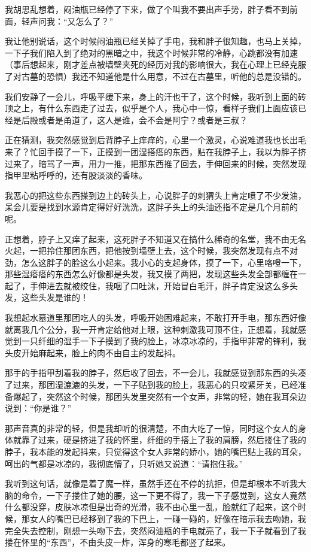 我胡思乱想着，闷油瓶已经停了下来，做了个叫我不要出声手势，胖子看不到前面，轻声问我：“又怎么了？”

我让他别说话，这个时候闷油瓶已经关掉了手电，我和胖子很知趣，也马上关掉，一下子我们陷入到了绝对的黑暗之中，我这个时候非常的冷静，心跳都没有加速（事后想起来，刚才差点被墙壁夹死的经历对我的影响很大，我在心理上已经克服了对古墓的恐惧）我还不知道他是什么用意，不过在古墓里，听他的总是没错的。

我们安静了一会儿，呼吸平缓下来，身上的汗也干了，这个时候，我听到上面的砖顶之上，有什么东西走了过去，似乎是个人，我心中一惊，看样子我们上面应该已经是后殿或者是甬道了，这人是谁，会不会是阿宁？或者是三叔？

正在猜测，我突然感觉到后背脖子上痒痒的，心里一个激灵，心说难道我也长出毛来了？忙回手摸了一下，正摸到一团湿搭瘩的东西，贴在我脖子上，我以为胖子挤过来了，暗骂了一声，用力一推，把那东西推了回去，手伸回来的时候，突然发现指甲里粘呼呼的，还有股淡淡的香味。

我恶心的把这些东西搽到边上的砖头上，心说胖子的刺猬头上肯定喷了不少发油，呆会儿要是找到水源肯定得好好洗洗，这胖子头上的头油还指不定是几个月前的呢。

正想着，脖子上又痒了起来，这死胖子不知道又在搞什么稀奇的名堂，我不由无名火起，一把拎住那团东西，把他按到墙壁上去，这个时候，我突然发现有点不对劲，怎么这胖子的脸这么小起来。我小心的支起身体，摸了一下，心里咯噔一下，那些湿瘩瘩的东西怎么好像都是头发，我又摸了两把，发现这些头发全部都缠在一起了，手伸进去就被绞住，我咽了口吐沫，开始冒白毛汗，胖子肯定没这么多头发，这些头发是谁的！

我想起水墓道里那团吃人的头发，呼吸开始困难起来，不敢打开手电，那东西好像就离我几个公分，我一开肯定给他对上眼，这种刺激我可顶不住，正想着，我就感觉到一只纤细的湿手一下子摸到了我的脸上，冰凉冰凉的，手指甲非常的锋利，我头皮开始麻起来，脸上的肉不由自主的发起抖。

那手的手指甲刮着我的脖子，然后收了回去，不一会儿，我就感觉到那东西的头凑了过来，那团湿漉漉的头发，一下子贴到我的脸上，我恶心的只咬紧牙关，已经准备爆起了，突然这个时候，那团头发里突然有一个女声，非常的轻，她在我耳朵边说到：“你是谁？”

那声音真的非常的轻，但是我却听的很清楚，不由大吃了一惊，同时这个女人的身体就靠了过来，硬是挤进了我的怀里，纤细的手搭上了我的肩膀，然后搂住了我的脖子，我本能的发起抖来，只觉得这个女人非常的娇小，她的嘴巴贴上我的耳朵，呵出的气都是冰凉的，我彻底懵了，只听她又说道：“请抱住我。”

我听到这句话，就像是着了魔一样，虽然手还在不停的抗拒，但是却根本不听我大脑的命令，一下子搂住了她的腰，这一下更不得了，我一下子感觉到，这女人竟然什么都没穿，皮肤冰凉但是出奇的光滑，我不由心里一乱，脸就红了起来，这个时候，那女人的嘴巴已经移到了我的下巴上，一碰一碰的，好像在暗示我去吻她，我完全失去控制，刚想一头吻下去，突然闷油瓶的手电就亮了，我一下子就看到了我搂在怀里的“东西”，不由头皮一炸，浑身的寒毛都竖了起来。

